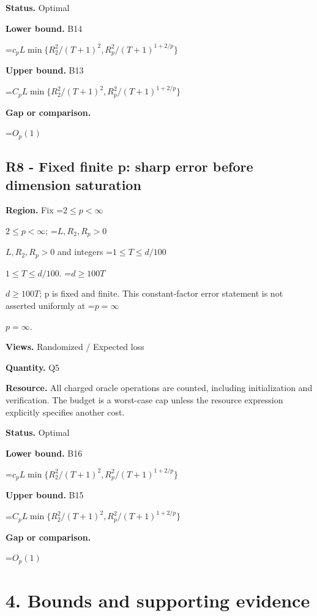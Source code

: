 \documentclass[10pt,a4paper]{article}
\newcommand{\AtlasMath}[1]{\par\begingroup\centering\setbox0=\hbox{$\displaystyle #1$}\ifdim\wd0>1.4\linewidth\typeout{ATLAS WIDE FORMULA: \the\wd0}\fi\ifdim\wd0>\linewidth\resizebox{\linewidth}{!}{\box0}\else\box0\fi\par\endgroup}
\newcommand{\AtlasInlineMath}[1]{\begingroup\setbox0=\hbox{$#1$}\ifdim\wd0>.4\linewidth\endgroup\AtlasMath{#1}\else\endgroup$#1$\fi}
\begin{document}
\textbf{Status.} Optimal



\textbf{Lower bound.} B14



\AtlasMath{c_pL\min\{R_2^2/(T+1)^2,R_p^2/(T+1)^{1+2/p}\}}


\textbf{Upper bound.} B13



\AtlasMath{C_pL\min\{R_2^2/(T+1)^2,R_p^2/(T+1)^{1+2/p}\}}


\textbf{Gap or comparison.}



\AtlasMath{O_p(1)}


\subsection{R8 - Fixed finite p: sharp error before dimension saturation}


\textbf{Region.} Fix \AtlasInlineMath{2\le p<\infty}; \AtlasInlineMath{L,R_2,R_p>0} and integers \AtlasInlineMath{1\le T\le d/100}. \AtlasInlineMath{d\ge100T}; p is fixed and finite. This constant-factor error statement is not asserted uniformly at \AtlasInlineMath{p=\infty}.



\textbf{Views.} Randomized / Expected loss



\textbf{Quantity.} Q5



\textbf{Resource.} All charged oracle operations are counted, including initialization and verification. The budget is a worst-case cap unless the resource expression explicitly specifies another cost.



\textbf{Status.} Optimal



\textbf{Lower bound.} B16



\AtlasMath{c_pL\min\{R_2^2/(T+1)^2,R_p^2/(T+1)^{1+2/p}\}}


\textbf{Upper bound.} B15



\AtlasMath{C_pL\min\{R_2^2/(T+1)^2,R_p^2/(T+1)^{1+2/p}\}}


\textbf{Gap or comparison.}



\AtlasMath{O_p(1)}


\section{4. Bounds and supporting evidence}
\end{document}
